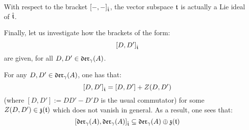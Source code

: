         \begin{corollary} \label{coro: toroidal_lie_algebras_are_ideals}
            With respect to the bracket $[-, -]_{\hat{\mathfrak{t}}}$, the vector subspace $\mathfrak{t}$ is actually a Lie ideal of $\hat{\mathfrak{t}}$.
        \end{corollary}

        Finally, let us investigate how the brackets of the form:
            $$[D, D']_{\hat{\mathfrak{t}}}$$
        are given, for all $D, D' \in \mathfrak{der}_{\gamma}(A)$.
        \begin{proposition} \label{prop: lie_bracket_on_orthogonal_complement_of_toroidal_centre}
            For any $D, D' \in \mathfrak{der}_{\gamma}(A)$, one has that:
                $$[D, D']_{\hat{\mathfrak{t}}} = [D, D'] + Z(D, D')$$
            (where $[D, D'] := DD' - D'D$ is the usual commutator) for some $Z(D, D') \in \mathfrak{z}(\mathfrak{t})$ which does not vanish in general. As a result, one sees that:
                $$[\mathfrak{der}_{\gamma}(A), \mathfrak{der}_{\gamma}(A)]_{\hat{\mathfrak{t}}} \subseteq \mathfrak{der}_{\gamma}(A) \oplus \mathfrak{z}(\mathfrak{t})$$
        \end{proposition}
